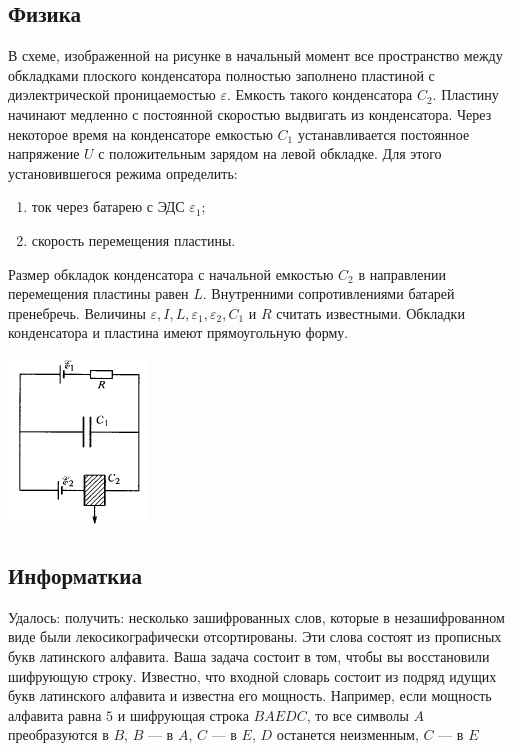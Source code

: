 \documentclass[a4paper, 12pt]{article}
\begin{document}
	 \subsection*{Физика}
	 В схеме, изображенной на рисунке в начальный момент все пространство между обкладками плоского конденсатора полностью заполнено пластиной с диэлектрической проницаемостью $\varepsilon$. Емкость такого конденсатора $C_2$. Пластину начинают медленно с постоянной скоростью выдвигать из конденсатора. Через некоторое время на конденсаторе емкостью $C_1$ устанавливается постоянное напряжение $U$ с положительным зарядом на левой обкладке. Для этого установившегося режима определить: 
	 \begin{enumerate}
	 	\item ток через батарею с ЭДС $\varepsilon_1$;
	 	\item скорость перемещения пластины.
	 \end{enumerate}
	 Размер обкладок конденсатора с начальной емкостью $C_2$ в направлении перемещения пластины равен $L$. Внутренними сопротивлениями батарей пренебречь. Величины $\varepsilon, I, L, \varepsilon_1, \varepsilon_2, C_1$ и $R$ считать известными. Обкладки конденсатора и пластина имеют прямоугольную форму. 
	 \begin{center}
	 	\includegraphics{3}
	 \end{center}
 \subsection*{Информаткиа}
 Удалось: получить: несколько зашифрованных слов, которые в незашифрованном виде были лекосикографически отсортированы. Эти слова состоят из прописных букв латинского алфавита. Ваша задача состоит в том, чтобы вы восстановили шифрующую строку. Известно, что входной словарь состоит из подряд идущих букв латинского алфавита и известна его мощность. Например, если мощность алфавита равна $5$ и шифрующая строка $BAEDC$, то все символы $A$ преобразуются в $B$, $B$ --- в $A$, $C$ --- в $E$, $D$ останется неизменным, $C$ --- в $E$
 
\end{document}
